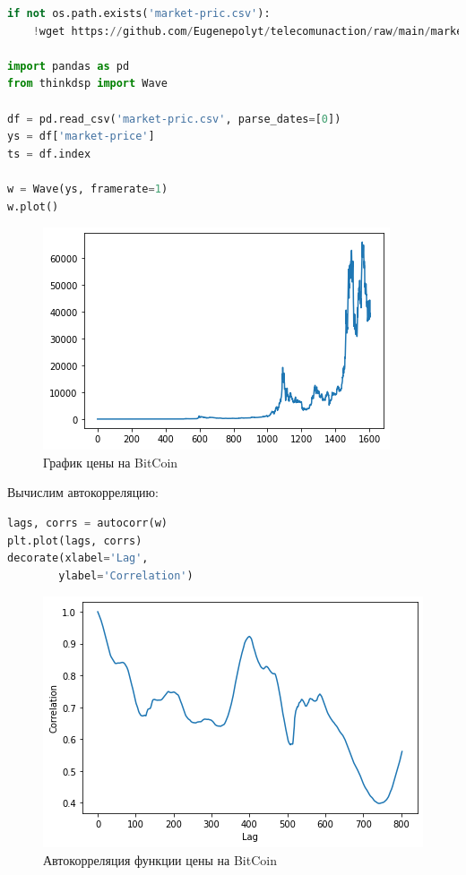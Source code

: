 \begin{lstlisting}[language=Python]
if not os.path.exists('market-pric.csv'):
    !wget https://github.com/Eugenepolyt/telecomunaction/raw/main/market-pric.csv

import pandas as pd
from thinkdsp import Wave

df = pd.read_csv('market-pric.csv', parse_dates=[0])
ys = df['market-price']
ts = df.index

w = Wave(ys, framerate=1)
w.plot()

\end{lstlisting}
\begin{figure}[H]
	\begin{center}
		\includegraphics[scale=1]{fig/lab05/lab05_5.png}
		\caption{График цены на BitCoin}
	\end{center}
\end{figure}

Вычислим автокорреляцию:

\begin{lstlisting}[language=Python]
lags, corrs = autocorr(w)
plt.plot(lags, corrs)
decorate(xlabel='Lag',
        ylabel='Correlation')
\end{lstlisting}
\begin{figure}[H]
	\begin{center}
		\includegraphics[scale=1]{fig/lab05/lab05_6.png}
		\caption{Автокорреляция функции цены на BitCoin}
	\end{center}
\end{figure}

